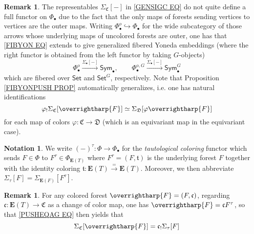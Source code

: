 \documentclass[a4paper,10pt
,draft
]{article}%
\numberwithin{equation}{section}
\numberwithin{figure}{section}
\theoremstyle{definition} %
\newtheorem{remark}[equation]{Remark}%
\newtheorem{notation}[equation]{Notation}%
\newcommand{\vect}[1]{\text{\overrightharp{\ensuremath{#1}}}}
\newcommand{\1}{\ensuremath{\mathbbm 1}}%
\begin{document}
\begin{remark}
The representables $\Sigma_{\mathfrak{C}}[-]$ in \eqref{GENSIGC EQ}
do not quite define a full functor on $\Phi_{\bullet}$
due to the fact that the only maps of forests 
sending vertices to vertices are the outer maps.
Writing $\Phi^o_{\bullet} \hookrightarrow \Phi_{\bullet}$
for the wide subcategory of those arrows whose underlying maps of uncolored forests are outer,
one has that \eqref{FIBYON EQ}
extends to give generalized fibered Yoneda embeddings
(where the right functor is obtained from the left functor by taking $G$-objects)
\[
\Phi_{\bullet}^o 
\xrightarrow{\Sigma_{\bullet}[-]}
\mathsf{Sym}_{\bullet},
\qquad
\Phi_{\bullet}^{o,G}
\xrightarrow{\Sigma_{\bullet}[-]}
\mathsf{Sym}^G_{\bullet}
\]
which are fibered over $\mathsf{Set}$ and $\mathsf{Set}^G$, respectively.
Note that Proposition \ref{FIBYONPUSH PROP} automatically generalizes, i.e. one has natural identifications
\begin{equation}\label{PUSHEQAG EQ}
\varphi_! \Sigma_{\mathfrak{C}}[\vect{F}] \simeq 
\Sigma_{\mathfrak{D}}[\varphi \vect{F}]
\end{equation}
for each map of colors
$\varphi \colon \mathfrak{C} \to \mathfrak{D}$
(which is an equivariant map in the equivariant case).
\end{remark}




\begin{notation}
We write $(-)^{\tau} \colon \Phi \to \Phi_{\bullet}$
for the \emph{tautological coloring} functor
which sends $F \in \Phi$ to 
$F^{\tau} \in \Phi_{\boldsymbol{E}(T)}$
where
$F^{\tau} = (F,\mathfrak{t})$ is the underlying forest $F$
together with the identity coloring
$\mathfrak{t} \colon \boldsymbol{E}(T) \xrightarrow{=} \boldsymbol{E}(T)$.
Moreover, we then abbreviate 
$\Sigma_{\tau}[F] = \Sigma_{\boldsymbol{E}(F)}[F^{\tau}]$.
\end{notation}


\begin{remark}
For any colored forest $\vect{F}=(F,\mathfrak{c})$,
regarding $\mathfrak{c} \colon \boldsymbol{E}(T) \to \mathfrak{C}$
as a change of color map, 
one has $\vect{F} = \mathfrak{c} F^{\tau}$,
so that \eqref{PUSHEQAG EQ} then yields that
\begin{equation}\label{CANPUSH EQ}
\Sigma_{\mathfrak{C}}[\vect{F}] = 
\mathfrak{c}_! \Sigma_{\tau}[F]
\end{equation}
\end{remark}
\end{document}
